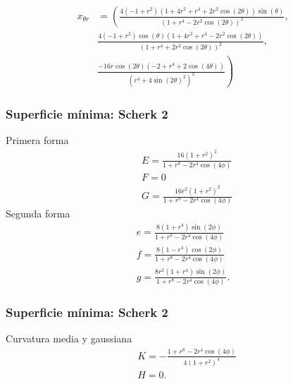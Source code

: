 \documentclass[10pt]{beamer}
\begin{document}
      \begin{frame}
        \begin{align*}
          x_{\theta r} &= \left( \frac{4 (-1 + r^2) (1 + 4 r^2 + r^4 + 2 r^2 \cos(2 \theta)) \sin(\theta)}{(1 + r^4 - 2 r^2 \cos(2 \theta))^2},\right.\\
          & \frac{4 (-1 + r^2) \cos(\theta) (1 + 4 r^2 + r^4 - 2 r^2 \cos(2 \theta))}{(1 + r^4 + 2 r^2 \cos(2 \theta))^2},\\
          &\left. \frac{-16 r \cos(2 \theta) (-2 + r^4 + 2 \cos(4 \theta))}{(r^4 + 4 \sin(2 \theta)^2)^2} \right)
        \end{align*}
        
          \end{frame}

  \begin{frame}
    \frametitle{Superficie mínima: Scherk 2}

  Primera forma    $$
\begin{aligned}
& E=\frac{16\left(1+r^2\right)^2}{1+r^8-2 r^4 \cos (4 \phi)} \\
& F=0 \\
& G=\frac{16 r^2\left(1+r^2\right)^2}{1+r^8-2 r^4 \cos (4 \phi)}
\end{aligned}
$$
Segunda forma 
$$
\begin{gathered}
e=\frac{8\left(1+r^4\right) \sin (2 \phi)}{1+r^8-2 r^4 \cos (4 \phi)} \\
f=\frac{8\left(1-r^4\right) \cos (2 \phi)}{1+r^8-2 r^4 \cos (4 \phi)} \\
g=\frac{8 r^2\left(1+r^4\right) \sin (2 \phi)}{1+r^8-2 r^4 \cos (4 \phi)} .
\end{gathered}
$$


  \end{frame}

  \begin{frame}
    \frametitle{Superficie mínima: Scherk 2}


   Curvatura media y gaussiana
    $$
    \begin{aligned}
    & K=-\frac{1+r^8-2 r^4 \cos (4 \phi)}{4\left(1+r^2\right)^4} \\
    & H=0 .
    \end{aligned}
    $$

  \end{frame}
  
  

  
\end{document}
